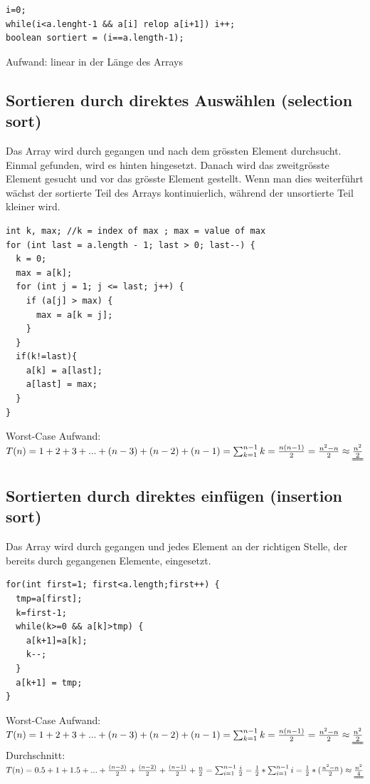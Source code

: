 \documentclass[a4paper,10pt]{article}
\begin{document}
\begin{lstlisting}
i=0;
while(i<a.lenght-1 && a[i] relop a[i+1]) i++;
boolean sortiert = (i==a.length-1);
\end{lstlisting}
Aufwand: linear in der L\"ange des Arrays \\

\subsection{Sortieren durch direktes Ausw\"ahlen (selection sort)}
Das Array wird durch gegangen und nach dem gr\"ossten Element durchsucht. Einmal gefunden, wird es hinten hingesetzt. Danach wird das zweitgr\"osste Element gesucht und vor das gr\"osste Element gestellt. Wenn man dies weiterf\"uhrt w\"achst der sortierte Teil des Arrays kontinuierlich, w\"ahrend der unsortierte Teil kleiner wird.
\begin{lstlisting}
int k, max; //k = index of max ; max = value of max
for (int last = a.length - 1; last > 0; last--) {
  k = 0;
  max = a[k];
  for (int j = 1; j <= last; j++) {
    if (a[j] > max) {
      max = a[k = j];
    }
  }
  if(k!=last){
    a[k] = a[last];
    a[last] = max;
  }
}
\end{lstlisting}
Worst-Case Aufwand: $T(n)=1+2+3+...+(n-3)+(n-2)+(n-1)=\sum^{n-1}_{k=1} k=\frac{n(n-1)}{2}=\frac{n^2-n}{2}\approx\uuline{\frac{n^2}{2}}$

\subsection{Sortierten durch direktes einf\"ugen (insertion sort)}
Das Array wird durch gegangen und jedes Element an der richtigen Stelle, der bereits durch gegangenen Elemente, eingesetzt.
\begin{lstlisting}
for(int first=1; first<a.length;first++) {
  tmp=a[first];
  k=first-1;
  while(k>=0 && a[k]>tmp) {
    a[k+1]=a[k];
    k--;
  }
  a[k+1] = tmp;
}
\end{lstlisting}
Worst-Case Aufwand: $T(n)=1+2+3+...+(n-3)+(n-2)+(n-1)=\sum^{n-1}_{k=1} k=\frac{n(n-1)}{2}=\frac{n^2-n}{2}\approx\uuline{\frac{n^2}{2}}$
Durchschnitt: $T(n)=0.5 + 1 + 1.5 + ... + \frac{(n-3)}{2} + \frac{(n-2)}{2} + \frac{(n-1)}{2}  + \frac{n}{2}=\sum^{n-1}_{i=1} \frac{i}{2}=\frac{1}{2}*\sum^{n-1}_{i=1} i = \frac{1}{2}*(\frac{n^2-n}{2})\approx\uuline{\frac{n^2}{4}}$
\end{document}

